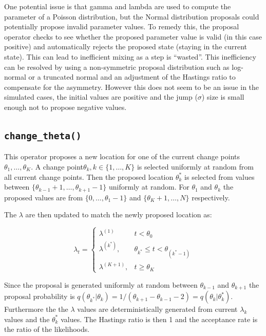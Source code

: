 \documentclass[11pt,a4paper]{article}
\numberwithin{equation}{section}
\begin{document}
One potential issue is that gamma and lambda are used to compute the
parameter of a Poisson distribution, but the Normal distribution
proposals could potentially propose invalid parameter values. To remedy
this, the proposal operator checks to see whether the proposed parameter
value is valid (in this case positive) and automatically rejects the
proposed state (staying in the current state). This can lead to
inefficient mixing as a step is ``wasted''. This inefficiency can be
resolved by using a non-symmetric proposal distribution such as
log-normal or a truncated normal and an adjustment of the Hastings ratio
to compensate for the asymmetry. However this does not seem to be an
issue in the simulated cases, the initial values are positive and the
jump (\(\sigma\)) size is small enough not to propose negative values.

\hypertarget{change_theta}{%
\subsection{\texorpdfstring{\texttt{change\_theta()}}{change\_theta()}}\label{change_theta}}

This operator proposes a new location for one of the current change
points \(\theta_1,\dots, \theta_K\). A change
point\(\theta_k, k \in \{1, \dots, K\}\) is selected uniformly at random
from all current change points. Then the proposed location
\(\theta_k^*\) is selected from values between
\(\{\theta_{k-1}+1,\dots, \theta_{k+1}-1\}\) uniformly at random. For
\(\theta_1\) and \(\theta_k\) the proposed values are from
\(\{0,\dots, \theta_1-1\}\) and \(\{\theta_K+1,\dots, N\}\)
respectively.

The \(\lambda\) are then updated to match the newly proposed location
as:

\[ \lambda_t =  \begin{cases} \lambda^{(1)} & t < \theta_0 \\
\lambda^{(k^*)}, & \theta_{k^*} \leq t < \theta_{(k^*-1)} \\
\lambda^{(K+1)}, & t \geq \theta_K \end{cases}\]

Since the proposal is generated uniformly at random between
\(\theta_{k-1}\) and \(\theta_{k+1}\) the proposal probability is
\(q(\theta_{k^*}|\theta_k) = 1/(\theta_{k+1}-\theta_{k-1}-2) = q(\theta_k|\theta_k^*)\).
Furthermore the the \(\lambda\) values are deterministically generated
from current \(\lambda_k\) values and the \(\theta_k^*\) values. The
Hastings ratio is then 1 and the acceptance rate is the ratio of the
likelihoods.
\end{document}
